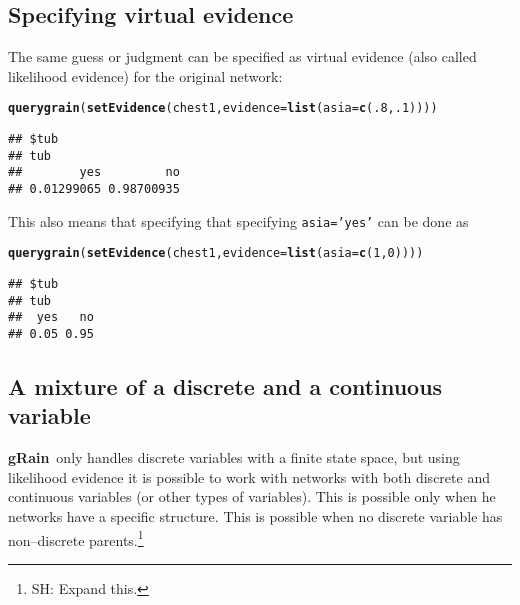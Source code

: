 \documentclass[10pt]{article}\usepackage[]{graphicx}\usepackage[]{color}
\makeatletter
\newcommand{\hlnum}[1]{\textcolor[rgb]{0.686,0.059,0.569}{#1}}%
\newcommand{\hlstd}[1]{\textcolor[rgb]{0.345,0.345,0.345}{#1}}%
\newcommand{\hlkwc}[1]{\textcolor[rgb]{0.333,0.667,0.333}{#1}}%
\newcommand{\hlkwd}[1]{\textcolor[rgb]{0.737,0.353,0.396}{\textbf{#1}}}%
\newenvironment{kframe}{%
 \def\at@end@of@kframe{}%
 \ifinner\ifhmode%
  \def\at@end@of@kframe{\end{minipage}}%
  \begin{minipage}{\columnwidth}%
 \fi\fi%
 \def\FrameCommand##1{\hskip\@totalleftmargin \hskip-\fboxsep
 \colorbox{shadecolor}{##1}\hskip-\fboxsep
     \hskip-\linewidth \hskip-\@totalleftmargin \hskip\columnwidth}%
 \MakeFramed {\advance\hsize-\width
   \@totalleftmargin\z@ \linewidth\hsize
   \@setminipage}}%
 {\par\unskip\endMakeFramed%
 \at@end@of@kframe}
\newenvironment{knitrout}{}{} %
\def\grbn{{\bf gRain}}
\def\code#1{{\texttt{#1}}}
\makeatother
\begin{document}
\subsection{Specifying virtual evidence}
\label{sec:spec-virt-evid}

The same guess or judgment can be specified as virtual evidence
(also called likelihood evidence) for the original network:

\begin{knitrout}
\color{fgcolor}\begin{kframe}
\begin{alltt}
\hlkwd{querygrain}\hlstd{(}\hlkwd{setEvidence}\hlstd{(chest1,} \hlkwc{evidence}\hlstd{=}\hlkwd{list}\hlstd{(}\hlkwc{asia}\hlstd{=}\hlkwd{c}\hlstd{(}\hlnum{.8}\hlstd{,} \hlnum{.1}\hlstd{))))}
\end{alltt}
\begin{verbatim}
## $tub
## tub
##        yes         no 
## 0.01299065 0.98700935
\end{verbatim}
\end{kframe}
\end{knitrout}

This also means that specifying that specifying \code{asia='yes'} can
be done as
\begin{knitrout}
\color{fgcolor}\begin{kframe}
\begin{alltt}
\hlkwd{querygrain}\hlstd{(}\hlkwd{setEvidence}\hlstd{(chest1,} \hlkwc{evidence}\hlstd{=}\hlkwd{list}\hlstd{(}\hlkwc{asia}\hlstd{=}\hlkwd{c}\hlstd{(}\hlnum{1}\hlstd{,} \hlnum{0}\hlstd{))))}
\end{alltt}
\begin{verbatim}
## $tub
## tub
##  yes   no 
## 0.05 0.95
\end{verbatim}
\end{kframe}
\end{knitrout}


\subsection{A mixture of a discrete and a continuous variable}
\label{sec:ixture}

\grbn\ only handles discrete variables with a finite state space, but
using likelihood evidence it is possible to work with networks with
both discrete and continuous variables (or other types of variables).
This is possible only when he networks
have a specific structure. This is possible when no discrete variable
has non--discrete parents.\footnote{SH: Expand this.}
\end{document}
